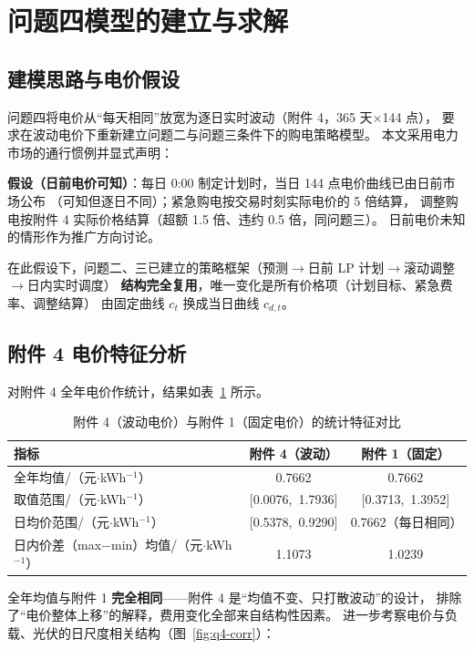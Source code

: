 \section{问题四模型的建立与求解}

\subsection{建模思路与电价假设}
问题四将电价从“每天相同”放宽为逐日实时波动（附件 4，365 天$\times$144 点），
要求在波动电价下重新建立问题二与问题三条件下的购电策略模型。
本文采用电力市场的通行惯例并显式声明：

\textbf{假设（日前电价可知）}：每日 0:00 制定计划时，当日 144 点电价曲线已由日前市场公布
（可知但逐日不同）；紧急购电按交易时刻实际电价的 5 倍结算，
调整购电按附件 4 实际价格结算（超额 1.5 倍、违约 0.5 倍，同问题三）。
日前电价未知的情形作为推广方向讨论。

在此假设下，问题二、三已建立的策略框架（预测$\to$日前 LP 计划$\to$滚动调整$\to$日内实时调度）
\textbf{结构完全复用}，唯一变化是所有价格项（计划目标、紧急费率、调整结算）
由固定曲线 $c_t$ 换成当日曲线 $c_{d,t}$。

\subsection{附件 4 电价特征分析}
对附件 4 全年电价作统计，结果如表~\ref{tab:q4-price} 所示。

\begin{table}[!htbp]
\caption{附件 4（波动电价）与附件 1（固定电价）的统计特征对比}\label{tab:q4-price}
\centering
\small
\begin{tabular}{lcc}
\toprule
指标 & 附件 4（波动） & 附件 1（固定） \\
\midrule
全年均值/（元$\cdot$kWh$^{-1}$） & 0.7662 & 0.7662 \\
取值范围/（元$\cdot$kWh$^{-1}$） & [0.0076,\ 1.7936] & [0.3713,\ 1.3952] \\
日均价范围/（元$\cdot$kWh$^{-1}$） & [0.5378,\ 0.9290] & 0.7662（每日相同） \\
日内价差（max$-$min）均值/（元$\cdot$kWh$^{-1}$） & 1.1073 & 1.0239 \\
\bottomrule
\end{tabular}
\end{table}

全年均值与附件 1 \textbf{完全相同}——附件 4 是“均值不变、只打散波动”的设计，
排除了“电价整体上移”的解释，费用变化全部来自结构性因素。
进一步考察电价与负载、光伏的日尺度相关结构（图~\ref{fig:q4-corr}）：

